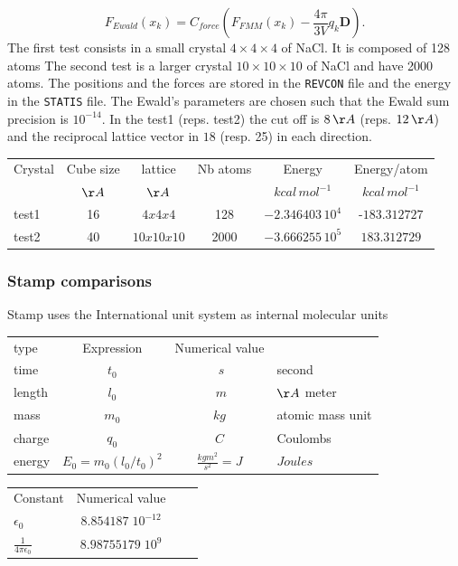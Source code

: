 \documentclass[12pt]{article} %
\begin{document}
\begin{equation}
F_{Ewald}(x_k) = C_{force} \left( F_{FMM}(x_k)  - \frac{4\pi}{3V} q_k \mathbf{D} \right ).
\end{equation}
The first test consists in a small crystal $4\times 4\times 4$ of NaCl. It is composed of 128 atoms The second test is a larger crystal  $10\times 10\times 10$ of NaCl and have 2000 atoms. The positions and the forces are stored in the \texttt{REVCON} file and the energy in the  \texttt{STATIS} file. The Ewald's parameters are chosen such that the  Ewald sum  precision is $10^{-14}$. In the test1 (reps. test2) the cut off is $8\, \AA$ (reps. $12\, \AA$) and the reciprocal lattice vector in $18$ (resp. 25) in each direction.
\begin{center}
\begin{tabular}{|l|c|c|c|c|c|}
\hline
Crystal  &Cube size & lattice & Nb atoms  &Energy  &Energy/atom\\
      &    $\AA$    & $\AA$    &     & $kcal\, mol^{-1}$ & $kcal\, mol^{-1}$\\
\hline
test1 & 16 & $4x4x4$ & 128 & $ -2.346403 \,10^{4}  $ & -$183.312727$\\
\hline
test2   & 40 &$10x10x10$  & 2000 & $-3.666255 \,10^{5} $ &$183.312729$\\
\hline
\end{tabular}
\end{center}

\subsubsection{Stamp comparisons}
Stamp uses the International unit system  as internal molecular units \\

\begin{tabular}{|l|c|c|l|}
\hline
type & Expression & Numerical value & \\
time &$t_0$ & $\;s$& second \\
length & $l_0$ &$\; m $& $\AA$ meter \\
mass &  $m_0$ & $ kg $& atomic mass unit\\
charge &  $q_0$ & $C$& Coulombs\\

energy & $E_0 = m_0(l_0/t_0)^2$& $\frac{kg m^2}{s^2}= J$ & $ Joules $\\
\hline
\end{tabular}
\begin{center}
\begin{tabular}{|l|c|c|l|}
\hline
Constant &  Numerical value  \\
$\epsilon_0$ & $8.854187\; 10^{-12}$\\
$\displaystyle\frac{1}{4\pi\epsilon_0}$& $8.98755179\; 10^{9}$ \\
\hline
\end{tabular}
\end{center}
\end{document}

